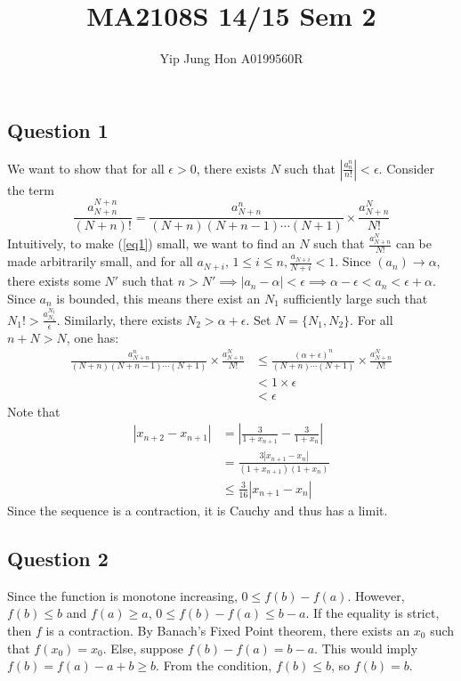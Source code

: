\documentclass{article}
\title{MA2108S 14/15 Sem 2}
\author{Yip Jung Hon A0199560R}
\begin{document}
\maketitle
\subsection*{Question 1}
We want to show that for all $\epsilon>0$, there exists $N$ such that $\left|\frac{a_n^n}{n!}\right|<\epsilon$.
Consider the term
\begin{equation}
    \frac{a_{N+n}^{N+n}}{(N+n)!} = \frac{a_{N+n}^n}{(N+n)(N+n-1) \cdots (N+1)} \times \frac{a_{N+n}^N}{N!} \label{eq1}
\end{equation}
Intuitively, to make (\ref{eq1}) small, we want to find an $N$ such that $\frac{a_{N+n}^N}{N!}$ can be made arbitrarily small, and for all $a_{N+i}$, $1 \leq i \leq n, \frac{a_{N+i}}{N+i}<1$. Since $(a_n) \to \alpha$, there exists some $N'$ such that $n>N' \implies |a_n - \alpha|<\epsilon \implies \alpha - \epsilon < a_n < \epsilon + \alpha$. Since $a_n$ is bounded, this means there exist an $N_1$ sufficiently large such that $N_1!>\frac{a_{N_1}^{N_1}}{\epsilon}$. Similarly, there exists $N_2 > \alpha + \epsilon$. Set $N = \{N_1, N_2\}$. For all $n+N>N$, one has:
\begin{align*}
    \frac{a_{N+n}^n}{(N+n)(N+n-1) \cdots (N+1)} \times \frac{a_{N+n}^N}{N!} &\leq  \frac{(\alpha+\epsilon)^n}{(N+n) \cdots (N+1)} \times \frac{a_{N+n}^N}{N!} \\
    &< 1 \times \epsilon \\
    &< \epsilon
\end{align*}
Note that 
\begin{align*}
    |x_{n+2} -x_{n+1}| &= \left|\frac{3}{1+x_{n+1}} - \frac{3}{1+x_n} \right| \\
    &= \frac{3|x_{n+1}-x_n|}{(1+x_{n+1})(1+x_n)} \\
    &\leq \frac{3}{16} |x_{n+1}-x_n|
\end{align*}
Since the sequence is a contraction, it is Cauchy and thus has a limit.

\subsection*{Question 2}
Since the function is monotone increasing, $0 \leq f(b) -f(a)$. However, $f(b) \leq b$ and $f(a) \geq a$, $0 \leq f(b) -f(a) \leq b-a$. If the equality is strict, then $f$ is a contraction. By Banach's Fixed Point theorem, there exists an $x_0$ such that $f(x_0)=x_0$. Else, suppose $ f(b) -f(a) =b-a$. This would imply $f(b)=f(a)-a+b \geq b$. From the condition, $f(b) \leq b$, so $f(b)=b$.
\end{document}
